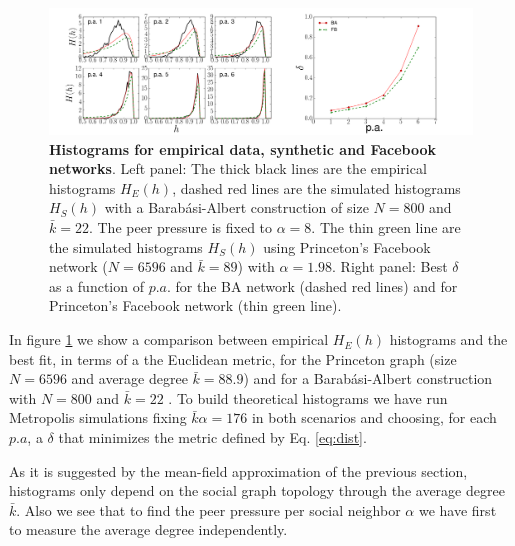 \documentclass[twocolumn,showpacs]{revtex4-1}
\begin{document}
\begin{widetext}

\begin{figure}[!ht]
  \centering \includegraphics[width=\textwidth]{fig8_facebook.png}
  \centering \caption{{\bf Histograms for empirical data, synthetic
      and Facebook networks}. Left panel: The thick black lines are the empirical histograms $H_E(h)$, dashed red lines are the simulated histograms $H_S(h)$ with a Barab\'asi-Albert construction of size $N=800$ and $\bar{k}= 22$. The peer pressure is fixed to $\alpha=8$. The thin green line are the simulated histograms $H_S(h)$ using Princeton's Facebook network ($N=6596$ and  $\bar{k} = 89$) with $\alpha=1.98$. Right panel: Best $\delta$ as a function of $p.a.$ for the BA network (dashed red lines) and for Princeton's Facebook network (thin green line). }
\label{fig:paall}
\end{figure}

\end{widetext}


In figure \ref{fig:paall} we show a comparison between empirical  $H_E(h)$ histograms and the best fit, in terms of  a the Euclidean metric, for the Princeton graph (size $N=6596$ and average degree $\bar{k} = 88.9$) and for a Barab\'asi-Albert construction with $N=800$ and $\bar{k}=22$ \cite{barabasireview}. To build theoretical histograms we have run Metropolis simulations \cite{Cavi10} fixing $\bar{k}\alpha=176$ in both scenarios and choosing, for each $p.a$, a $\delta$ that minimizes the metric defined by Eq. \ref{eq:dist}.  

As it is suggested by the mean-field approximation of the previous section, histograms only depend on the social graph topology through the average degree $\bar{k}$. Also we see that  to find the peer pressure per social neighbor $\alpha$  we have first to  measure the average degree independently.
\end{document}
